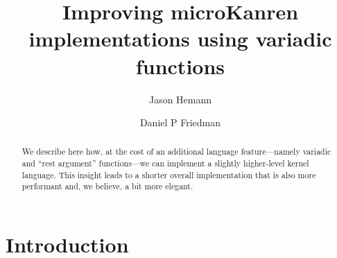 \documentclass[sigplan,screen,draft,anonymous,review,natbib=false]{acmart}
\begin{document}
\title{Improving microKanren implementations using variadic functions}

\author{Jason Hemann}
\author{Daniel P Friedman}

\renewcommand{\shortauthors}{Hemann et al.}

\begin{abstract}
We describe here how, at the cost of an additional language
feature---namely variadic and \enquote{rest argument} functions---we
can implement a slightly higher-level kernel language. This insight
leads to a shorter overall implementation that is also more performant
and, we believe, a bit more elegant.
\end{abstract}


\keywords{}

\maketitle

\section{Introduction}
\end{document}

